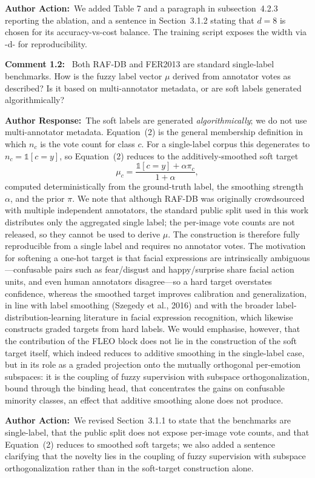 \documentclass[11pt]{article}
\newcommand{\comment}[1]{\smallskip\noindent\textbf{\color{navy}Comment #1:}\ }
\newcommand{\response}{\smallskip\par\noindent\textbf{\color{steel}Author Response:}\ }
\newcommand{\action}{\smallskip\par\noindent\textbf{\color{steel}Author Action:}\ }
\begin{document}
\action We added Table 7 and a paragraph  in subsection~4.2.3 reporting the ablation, and
a sentence in Section~3.1.2 stating that $d=8$ is chosen for its accuracy-vs-cost balance.
The training script exposes the width via -d- for reproducibility.


\comment{1.2} Both RAF-DB and FER2013 are standard single-label benchmarks. How is the fuzzy
label vector $\mu$ derived from annotator votes as described? Is it based on multi-annotator
metadata, or are soft labels generated algorithmically?

\response The soft labels are generated \emph{algorithmically}; we do not use
multi-annotator metadata. Equation~(2) is the general membership definition in which $n_c$
is the vote count for class $c$. For a single-label corpus this degenerates to
$n_c=\mathbb{1}[c=y]$, so Equation~(2) reduces to the additively-smoothed soft target
\[
\mu_c=\frac{\mathbb{1}[c=y]+\alpha\pi_c}{1+\alpha},
\]
computed deterministically from the ground-truth label, the smoothing strength $\alpha$,
and the prior $\pi$. We note that although RAF-DB was originally crowdsourced with multiple
independent annotators, the standard public split used in this work distributes only the
aggregated single label; the per-image vote counts are not released, so they cannot be used
to derive $\mu$. The construction is therefore fully reproducible from a single label and
requires no annotator votes. The motivation for softening a one-hot target is that facial
expressions are intrinsically ambiguous---confusable pairs such as fear/disgust and
happy/surprise share facial action units, and even human annotators disagree---so a hard
target overstates confidence, whereas the smoothed target improves calibration and
generalization, in line with label smoothing (Szegedy et al., 2016) and with the broader
label-distribution-learning literature in facial expression recognition, which likewise
constructs graded targets from hard labels. We would emphasise, however, that the
contribution of the FLEO block does not lie in the construction of the soft target itself,
which indeed reduces to additive smoothing in the single-label case, but in its role as a
graded projection onto the mutually orthogonal per-emotion subspaces: it is the coupling of
fuzzy supervision with subspace orthogonalization, bound through the binding head, that
concentrates the gains on confusable minority classes, an effect that additive smoothing
alone does not produce.

\action We revised Section~3.1.1 to state that the benchmarks are single-label, that the
public split does not expose per-image vote counts, and that Equation~(2) reduces to
smoothed soft targets; we also added a sentence clarifying that the novelty lies in the
coupling of fuzzy supervision with subspace orthogonalization rather than in the soft-target
construction alone.
\newline
\end{document}
